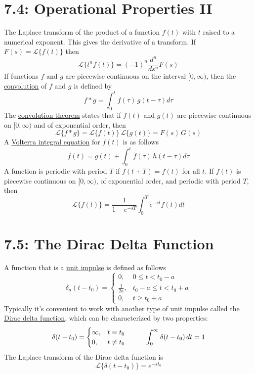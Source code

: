 \documentclass{article}
\newcommand{\lpl}{\mathscr{L}}
\begin{document}
\section*{7.4: Operational Properties II}
The Laplace transform of the product of a function \(f(t)\) with \(t\) raised to a numerical exponent. This gives the derivative of a transform. If \(F(s)=\lpl\{f(t)\}\) then
\[\lpl\{t^nf(t)\}=(-1)^n\frac{d^n}{ds^n}F(s)\]
If functions \(f\) and \(g\) are piecewise continuous on the interval \([0,\infty)\), then the \underline{convolution} of \(f\) and \(g\) is defined by
\[f*g=\int_0^tf(\tau)\,g(t-\tau)d\tau\]
The \underline{convolution theorem} states that if \(f(t)\) and \(g(t)\) are piecewise continuous on \([0,\infty)\) and of exponential order, then
\[\lpl\{f*g\}=\lpl\{f(t)\}\,\lpl\{g(t)\}=F(s)\,G(s)\]
A \underline{Volterra integral equation} for \(f(t)\) is as follows
\[f(t)=g(t)+\int_0^tf(\tau)\,h(t-\tau)d\tau\]
A function is periodic with period \(T\) if \(f(t+T)=f(t)\) for all \(t\). If \(f(t)\) is piecewise continuous on \([0,\infty)\), of exponential order, and periodic with period \(T\), then
\[\lpl\{f(t)\}=\frac{1}{1-e^{-sT}}\int_0^Te^{-st}f(t)dt\]
\section*{7.5: The Dirac Delta Function}
A function that is a \underline{unit impulse} is defined as follows
\begin{equation*}
\delta_a(t-t_0)=
    \begin{cases}
        0, &  0\leq t<t_0-a\\
        \frac{1}{2a}, & t_0-a\leq t < t_0+a\\
        0, & t\geq t_0+a
    \end{cases}
\end{equation*}
Typically it's convenient to work with another type of unit impulse called the \underline{Dirac delta function}, which can be characterized by two properties:
\begin{equation*}
\delta(t-t_0)=
    \begin{cases}
        \infty, &  t=t_0\\
        0, & t\neq t_0
    \end{cases}
    \hspace{10 mm}\int_0^\infty\delta(t-t_0)\,dt=1
\end{equation*}
The Laplace transform of the Dirac delta function is
\[\lpl\{\delta(t-t_0)\}=e^{-st_0}\]
\end{document}
